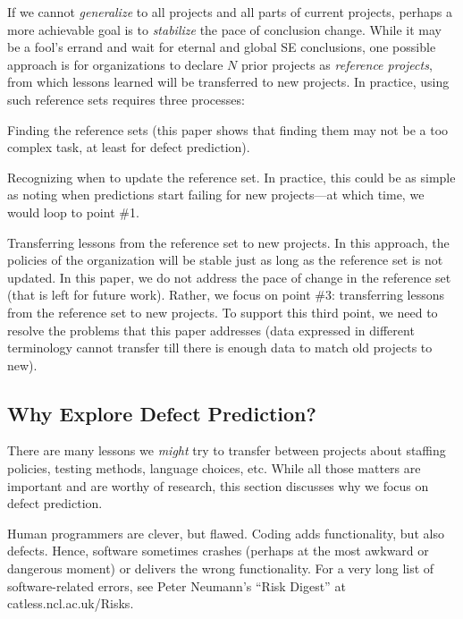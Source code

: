If we cannot {\em generalize} to all projects and all parts
of current projects, perhaps a more achievable goal is to {\em stabilize} the pace of conclusion change. 
While it may be 
a fool's errand  and wait for  eternal and global SE
conclusions, one possible approach is for organizations
to declare $N$ prior projects as {\em reference projects},
from which lessons learned will be transferred to new projects.
In practice, using such reference sets requires three processes:
\squishlist

\item Finding the reference sets (this paper shows that finding
  them may not be a too complex task, at least for defect prediction).
  \item Recognizing when to update  the reference set. In practice,
  this could be as simple as noting when predictions start failing for new projects---at which time, we would loop to point \#1.
\item Transferring
  lessons from the reference set to new projects.  
\squishend
In this approach, the policies of the organization will be
stable just as long as the reference set is not updated.
In this paper, we do not address the pace of change in the reference set
(that is left for future work).
Rather, we focus on point \#3: transferring lessons from
the reference set to new projects. To support this third point,
we need to resolve the problems
  that this paper addresses (data expressed in different terminology
  cannot transfer till there is enough data to match old projects to new).

  


\subsection{Why Explore Defect Prediction?}

There are many lessons we {\em might} try to transfer between projects
about staffing policies, testing methods, language choices, etc. While
all those matters are important and are worthy of research, this section
discusses why we focus on defect prediction.  

Human programmers are clever, but flawed. Coding  adds functionality, but also defects.
Hence, software sometimes crashes (perhaps at the most awkward or dangerous moment) or delivers
the wrong functionality. For a very long list of software-related errors,
see  Peter Neumann's ``Risk Digest'' at catless.ncl.ac.uk/Risks.

